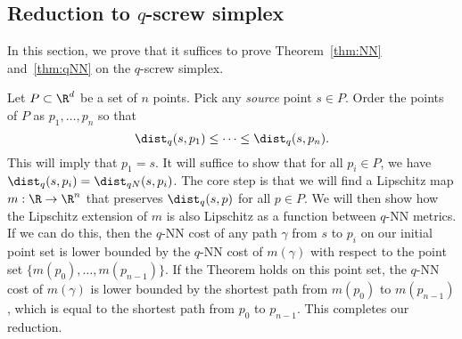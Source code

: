 \subsection{Reduction to $q$-screw simplex} %
\label{sec:reduction-to-screw}
In this section, we prove that it suffices to prove Theorem~\ref{thm:NN}
and~\ref{thm:qNN} on the $q$-screw simplex. 

Let $P\subset \R^d$ be a set of $n$ points.
  Pick any \emph{source} point $s\in P$.
  Order the points of $P$ as $p_1,\ldots ,p_n$ so that
  \[
    \dist_q(s,p_1) \le \cdots \le \dist_q(s, p_n).
  \]
  This will imply that $p_1 = s$.
  It will suffice to show that for all $p_i\in P$, we have $\dist_q(s,p_i)
= \dist_{qN}(s,p_i)$.
The core step is that we will find a Lipschitz map $m: \R \rightarrow \R^n$
that preserves $\dist_q(s,p)$ for all $p \in P$. We will then show how the
Lipschitz extension of $m$ is also Lipschitz as a function between $q$-NN
metrics. If we can do this, then the $q$-NN cost of any path $\gamma$ from $s$ to
$p_i$ on our initial point set is lower bounded by the $q$-NN cost of
$m(\gamma)$ with respect to the point set $\{m(p_0), \ldots, m(p_{n-1})\}$.
If the Theorem holds on this point set,
 the $q$-NN cost of $m(\gamma)$ is lower bounded by the shortest path
from $m(p_0)$ to $m(p_{n-1})$, which is equal to the shortest path from
$p_0$ to $p_{n-1}$. This completes our reduction.
  
  
  
  

